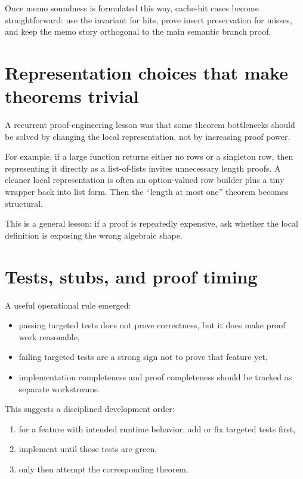 \documentclass[11pt]{article}
\begin{document}
Once memo soundness is formulated this way, cache-hit cases become straightforward: use the invariant for hits, prove insert preservation for misses, and keep the memo story orthogonal to the main semantic branch proof.

\section{Representation choices that make theorems trivial}

A recurrent proof-engineering lesson was that some theorem bottlenecks should be solved by changing the local representation, not by increasing proof power.

For example, if a large function returns either no rows or a singleton row, then representing it directly as a list-of-lists invites unnecessary length proofs. A cleaner local representation is often an option-valued row builder plus a tiny wrapper back into list form. Then the ``length at most one'' theorem becomes structural.

This is a general lesson: if a proof is repeatedly expensive, ask whether the local definition is exposing the wrong algebraic shape.

\section{Tests, stubs, and proof timing}

A useful operational rule emerged:

\begin{itemize}
  \item passing targeted tests does not prove correctness, but it does make proof work reasonable,
  \item failing targeted tests are a strong sign not to prove that feature yet,
  \item implementation completeness and proof completeness should be tracked as separate workstreams.
\end{itemize}

This suggests a disciplined development order:

\begin{enumerate}
  \item for a feature with intended runtime behavior, add or fix targeted tests first,
  \item implement until those tests are green,
  \item only then attempt the corresponding theorem.
\end{enumerate}
\end{document}
